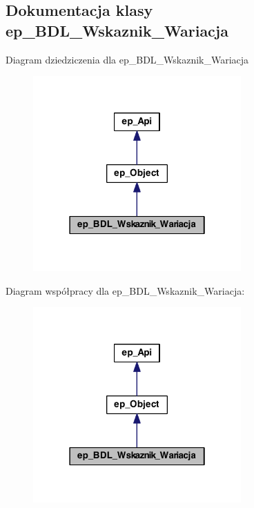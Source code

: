 \hypertarget{classep___b_d_l___wskaznik___wariacja}{\subsection{Dokumentacja klasy ep\-\_\-\-B\-D\-L\-\_\-\-Wskaznik\-\_\-\-Wariacja}
\label{classep___b_d_l___wskaznik___wariacja}
}


Diagram dziedziczenia dla ep\-\_\-\-B\-D\-L\-\_\-\-Wskaznik\-\_\-\-Wariacja\nopagebreak
\begin{figure}[H]
\begin{center}
\leavevmode
\includegraphics[width=226pt]{classep___b_d_l___wskaznik___wariacja__inherit__graph}
\end{center}
\end{figure}


Diagram współpracy dla ep\-\_\-\-B\-D\-L\-\_\-\-Wskaznik\-\_\-\-Wariacja\-:\nopagebreak
\begin{figure}[H]
\begin{center}
\leavevmode
\includegraphics[width=226pt]{classep___b_d_l___wskaznik___wariacja__coll__graph}
\end{center}
\end{figure}
